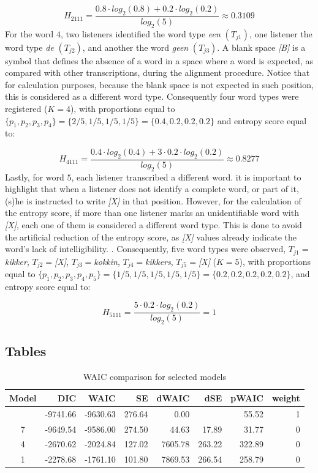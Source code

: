 \documentclass[
]{agujournal2019}
\begin{document}
\[ 
H_{2111} = \frac{ 0.8 \cdot log_{2}(0.8) + 0.2 \cdot log_{2}(0.2) }{ log_{2}(5)} \approx 0.3109
\] For the word \(4\), two listeners identified the word type \emph{een}
\((T_{j1})\), one listener the word type \emph{de} \((T_{j2})\), and
another the word \emph{geen} \((T_{j3})\). A blank space \emph{{[}B{]}}
is a symbol that defines the absence of a word in a space where a word
is expected, as compared with other transcriptions, during the alignment
procedure. Notice that for calculation purposes, because the blank space
is not expected in such position, this is considered as a different word
type. Consequently four word types were registered (\(K=4\)), with
proportions equal to
\(\{ p_{1}, p_{2}, p_{3}, p_{4} \} = \{ 2/5, 1/5, 1/5, 1/5 \} = \{ 0.4, 0.2, 0.2, 0.2 \}\)
and entropy score equal to:

\[ 
H_{4111} = \frac{ 0.4 \cdot log_{2}(0.4) + 3 \cdot 0.2 \cdot log_{2}(0.2) }{ log_{2}(5)} \approx 0.8277
\] Lastly, for word \(5\), each listener transcribed a different word.
it is important to highlight that when a listener does not identify a
complete word, or part of it, (s)he is instructed to write
\emph{{[}X{]}} in that position. However, for the calculation of the
entropy score, if more than one listener marks an unidentifiable word
with \emph{{[}X{]}}, each one of them is considered a different word
type. This is done to avoid the artificial reduction of the entropy
score, as \emph{{[}X{]}} values already indicate the word's lack of
intelligibility. . Consequently, five word types were observed,
\(T_{j1}=\)\emph{kikker}, \(T_{j2}=\)\emph{{[}X{]}},
\(T_{j3}=\)\emph{kokkin}, \(T_{j4}=\)\emph{kikkers},
\(T_{j5}=\)\emph{{[}X{]}} (\(K=5\)), with proportions equal to
\(\{ p_{1}, p_{2}, p_{3}, p_{4}, p_{5} \} = \{ 1/5, 1/5, 1/5, 1/5, 1/5 \} = \{ 0.2, 0.2, 0.2, 0.2, 0.2 \}\),
and entropy score equal to:

\[ 
H_{5111} = \frac{ 5 \cdot 0.2 \cdot log_{2}(0.2) }{ log_{2}(5)} = 1
\]

\subsection{Tables}\label{sec-appB}

\begin{longtable}[]{@{}crrrrrrr@{}}

\caption{\label{tbl-rq1-waic}WAIC comparison for selected models}

\tabularnewline

\toprule\noalign{}
Model & DIC & WAIC & SE & dWAIC & dSE & pWAIC & weight \\
\midrule\noalign{}
\endhead
\bottomrule\noalign{}
\endlastfoot
10 & -9741.66 & -9630.63 & 276.64 & 0.00 & & 55.52 & 1 \\
7 & -9649.54 & -9586.00 & 274.50 & 44.63 & 17.89 & 31.77 & 0 \\
4 & -2670.62 & -2024.84 & 127.02 & 7605.78 & 263.22 & 322.89 & 0 \\
1 & -2278.68 & -1761.10 & 101.80 & 7869.53 & 266.54 & 258.79 & 0 \\

\end{longtable}
\end{document}
